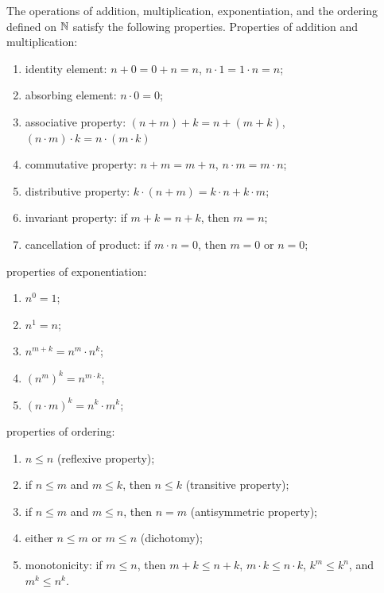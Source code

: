 \begin{theorem}
\label{th:operazioni_naturali}%
%
%
The operations of addition, multiplication, exponentiation, 
and the ordering defined on ${\mathbb N}$
satisfy the following properties.
Properties of addition and multiplication:
\begin{enumerate}
    \item identity element:
      $n + 0 = 0 + n = n$,
      $n\cdot 1 = 1\cdot n = n$;
    \item absorbing element:
      $n\cdot 0 = 0$;
    \item associative property: 
      $(n+m)+k = n+(m+k)$, $(n\cdot m)\cdot k = n \cdot (m\cdot k)$
    \item commutative property: 
      $n+m = m+n$, $n\cdot m = m\cdot n$;
    \item distributive property:
     $k\cdot (n+m) = k\cdot n + k\cdot m$;
    \item invariant property:
     if $m+k = n+k$, then $m=n$;
    \item cancellation of product: if $m\cdot n=0$, then $m=0$ or $n=0$;
\end{enumerate}
properties of exponentiation:
\begin{enumerate}
  \item $n^0 = 1$;
  \item $n^1 = n$;
  \item $n^{m+k} = n^m \cdot n^k$;
  \item $(n^m)^k = n^{m\cdot k}$;
  \item $(n\cdot m)^k = n^k \cdot m^k$;
\end{enumerate}
properties of ordering:
\begin{enumerate}
  \item $n\le n$ (reflexive property);
  \item if $n\le m$ and $m\le k$, then $n\le k$ (transitive property);
  \item if $n\le m$ and $m\le n$, then $n=m$ (antisymmetric property);
  \item either $n\le m$ or $m\le n$ (dichotomy);
  \item monotonicity:
   if $m\le n$, then 
   $m+k\le n+k$, $m\cdot k \le n\cdot k$,
   $k^m \le k^n$, and $m^k \le n^k$. 
\end{enumerate}
\end{theorem}
%
